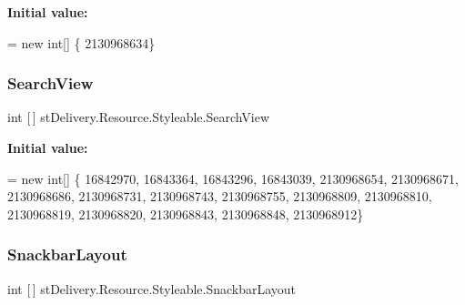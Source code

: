 {\bfseries Initial value\+:}
\begin{DoxyCode}
= \textcolor{keyword}{new} \textcolor{keywordtype}{int}[] \{
                    2130968634\}
\end{DoxyCode}
\mbox{\label{classst_delivery_1_1_resource_1_1_styleable_acaf0ac0dfe90fc1d5c5816618a73fba2}} 
\subsubsection{\texorpdfstring{Search\+View}{SearchView}}
{\footnotesize\ttfamily int \mbox{[}$\,$\mbox{]} st\+Delivery.\+Resource.\+Styleable.\+Search\+View\hspace{0.3cm}{\ttfamily [static]}}

{\bfseries Initial value\+:}
\begin{DoxyCode}
= \textcolor{keyword}{new} \textcolor{keywordtype}{int}[] \{
                    16842970,
                    16843364,
                    16843296,
                    16843039,
                    2130968654,
                    2130968671,
                    2130968686,
                    2130968731,
                    2130968743,
                    2130968755,
                    2130968809,
                    2130968810,
                    2130968819,
                    2130968820,
                    2130968843,
                    2130968848,
                    2130968912\}
\end{DoxyCode}
\mbox{\label{classst_delivery_1_1_resource_1_1_styleable_ae3c099517cc60f4b4e646f79f67c3c85}} 
\subsubsection{\texorpdfstring{Snackbar\+Layout}{SnackbarLayout}}
{\footnotesize\ttfamily int \mbox{[}$\,$\mbox{]} st\+Delivery.\+Resource.\+Styleable.\+Snackbar\+Layout\hspace{0.3cm}{\ttfamily [static]}}

